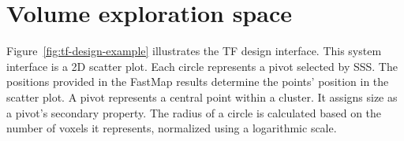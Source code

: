 \section{Volume exploration space}
\label{sect:volume-exploration-space}
Figure~\ref{fig:tf-design-example} illustrates the TF design interface. This system interface is a 2D scatter plot. Each circle represents a pivot selected by SSS. The positions provided in the FastMap results determine the points' position in the scatter plot. A pivot represents a central point within a cluster. It assigns size as a pivot's secondary property. The radius of a circle is calculated based on the number of voxels it represents, normalized using a logarithmic scale.

\begin{figure}[htb!]
    \centering
    \hfill

\end{figure}
